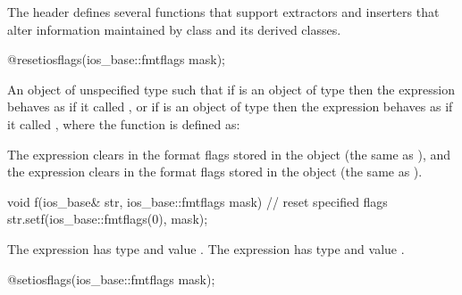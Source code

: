 \pnum
The header  defines several functions that support
extractors and inserters that alter information maintained by class
 and its derived classes.

%
\begin{itemdecl}
@\unspec@ resetiosflags(ios_base::fmtflags mask);
\end{itemdecl}

\begin{itemdescr}
\pnum
\returns
An object of
unspecified type such that if  is an object of type
 then the expression
 behaves as if it called
, or if  is an object of type
 then the expression
 behaves as if it called
, where the function 
is defined as:
\begin{footnote}
 The expression 
clears  in the format flags stored in the
 object  (the same as
), and the expression
 clears  in the
format flags stored in the  object
 (the same as ).
\end{footnote}

\begin{codeblock}
void f(ios_base& str, ios_base::fmtflags mask) {
  // reset specified flags
  str.setf(ios_base::fmtflags(0), mask);
}
\end{codeblock}

The expression  has
type  and value . The
expression  has type
 and value .
\end{itemdescr}

%
\begin{itemdecl}
@\unspec@ setiosflags(ios_base::fmtflags mask);
\end{itemdecl}

